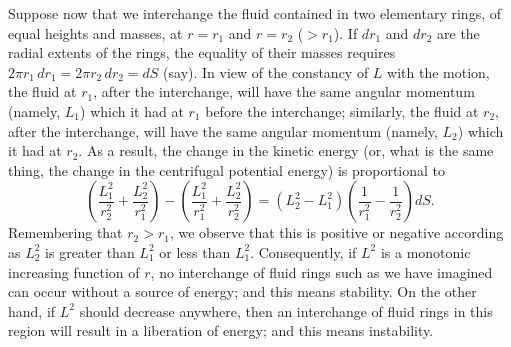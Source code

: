 Suppose now that we interchange the fluid contained in two elementary
rings, of equal heights and masses, at $r = r_1$ and $r = r_2$ ($> r_1$).  If
$dr_1$ and $dr_2$ are the radial extents of the rings, the equality of their
masses requires $2\pi r_1\, dr_1 = 2\pi r_2\, dr_2 = dS$ (say).  In view of the constancy
of $L$ with the motion, the fluid at $r_1$, after the interchange, will have
the same angular momentum (namely, $L_1$) which it had at $r_1$ before the
interchange; similarly, the fluid at $r_2$, after the interchange, will have the
same angular momentum (namely, $L_2$) which it had at $r_2$.  As a result,
the change in the kinetic energy (or, what is the same thing, the change
in the centrifugal potential energy) is proportional to
\begin{equation}
\label{eq:7-17}
\left(\frac{L_1^2}{r_2^2} + \frac{L_2^2}{r_1^2}\right)
- \left(\frac{L_1^2}{r_1^2} + \frac{L_2^2}{r_2^2}\right)
= (L_2^2 - L_1^2)\!\left(\frac{1}{r_1^2} - \frac{1}{r_2^2}\right)\! dS.
\end{equation}
Remembering that $r_2 > r_1$, we observe that this is positive or negative
according as $L_2^2$ is greater than $L_1^2$ or less than $L_1^2$.  Consequently, if $L^2$
is a monotonic increasing function of $r$, no interchange of fluid rings
such as we have imagined can occur without a source of energy; and this
means stability.  On the other hand, if $L^2$ should decrease anywhere,
then an interchange of fluid rings in this region will result in a liberation
of energy; and this means instability.

